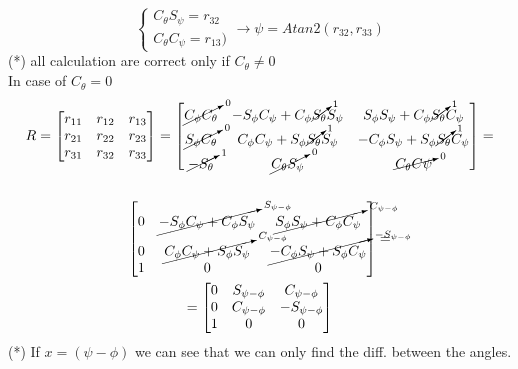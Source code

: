 \documentclass{article}
\begin{document}
\begin{enumerate}
    
    \begin{equation}
    \begin{cases}
         C_\theta S_\psi = r_{32} \\
         C_\theta C_\psi = r_{13}   )
    \end{cases} \xrightarrow[]{}
     \psi = Atan2(r_{32}, r_{33} )
    \end{equation}
    (*) all calculation are correct only if $C_\theta \ne 0$\\
    
    In case of $C_\theta = 0$\\
    
     \begin{multline*}
     R = 
        \begin{bmatrix}
        r_{11} & r_{12} & r_{13} \\
        r_{21} & r_{22} & r_{23} \\
        r_{31} & r_{32} & r_{33}
        \end{bmatrix} = 
        \begin{bmatrix}
         \cancelto{0}{C_\phi C_\theta}  & -S_\phi C_\psi + C_\phi \cancelto{1}{S_\theta} S_\psi & S_\phi S_\psi + C_\phi \cancelto{1}{S_\theta} C_\psi \\
        \cancelto{0}{S_\phi C_\theta} & C_\phi C_\psi + S_\phi \cancelto{1}{S_\theta} S_\psi & -C_\phi S_\psi + S_\phi \cancelto{1}{S_\theta} C_\psi \\
        \cancelto{1}{-S_\theta} & \cancelto{0}{C_\theta S_\psi} & \cancelto{0}{C_\theta C\psi}
        \end{bmatrix} =\\
        \\
        \begin{bmatrix}
         0  & \cancelto{S_{\psi-\phi} }{-S_\phi C_\psi + C_\phi  S_\psi} & \cancelto{C_{\psi-\phi} }{S_\phi S_\psi + C_\phi  C_\psi} \\
        0 & \cancelto{C_{\psi-\phi} }{C_\phi C_\psi + S_\phi  S_\psi} & \cancelto{-S_{\psi-\phi} }{-C_\phi S_\psi + S_\phi  C_\psi} \\
        1 & 0 & 0
        \end{bmatrix} = \\
        =
        \begin{bmatrix}
         0  & S_{\psi-\phi}  & C_{\psi-\phi} \\
        0 & C_{\psi-\phi} & -S_{\psi-\phi}  \\
        1 & 0 & 0
        \end{bmatrix}
     \end{multline*}
     (*) If $x=(\psi - \phi)$ we can see that we can only find the diff. between the angles.\\
     

\end{enumerate}
\end{document}
